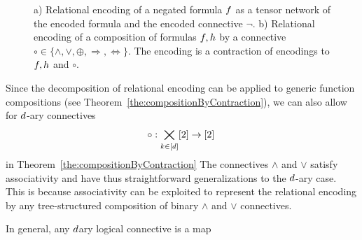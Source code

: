 \begin{figure}[h]
\begin{center}
	
\end{center}
\caption{a) Relational encoding of a negated formula $f$ as a tensor network of the encoded formula and the encoded connective $\lnot$.
b) Relational encoding of a composition of formulas $f, h$ by a connective $\circ\in\{\land,\lor,\oplus,\Rightarrow,\Leftrightarrow\}$. 
The encoding is a contraction of encodings to  $f, h$ and $\circ$.}
\label{fig:NegatedFormulaTensor} 
\end{figure}



\begin{remark}\label{rem:naryConnectives}
	Since the decomposition of relational encoding can be applied to generic function compositions (see Theorem~\ref{the:compositionByContraction}), we can also allow for $d$-ary connectives
		\[ \circ : \bigtimes_{k\in[d]} [2] \rightarrow [2] \,  \]
	in Theorem~\ref{the:compositionByContraction}
	The connectives $\land$ and $\lor$ satisfy associativity and have thus straightforward generalizations to the $d$-ary case.
	This is because associativity can be exploited to represent the relational encoding by any tree-structured composition of binary $\land$ and $\lor$ connectives.
\end{remark}

In general, any $d$ary logical connective is a map

